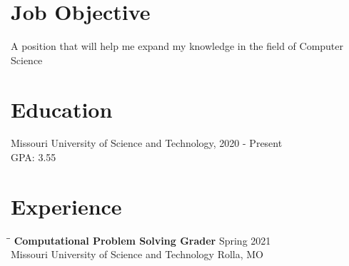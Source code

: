 \documentclass{res}
\begin{document}
 


\address{ \textcolor{blue}{\underline{\href{mailto:rat23h@mst.edu}{rat23h@mst.edu}}} - (636) 730-8032 - \textcolor{blue}{\underline{\href{https://github.com/Skrublaub/resume}{This Resume}}}}
                                  
\begin{resume}

\section{Job Objective}          
    A position that will help me expand my knowledge in the field
    of Computer Science
 
\section{Education}          
    Missouri University of Science and Technology, 2020 - Present\\        
    GPA: 3.55          

 
\section{Experience}
   \vspace{-0.1in}	
   \begin{tabbing}
   \hspace{2.3in}\= \hspace{2.6in}\= \kill %
    {\bf Computational Problem Solving Grader} \>  \>Spring 2021\\
    		Missouri University of Science and Technology\>\> Rolla, MO\\
                             

\end{tabbing}
\end{resume}
\end{document}
